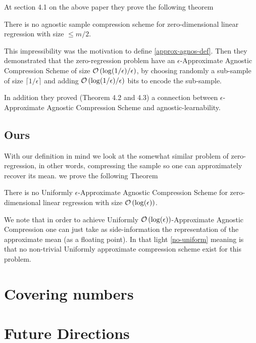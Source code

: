 \documentclass{article}
\begin{document}
At section 4.1 on the above paper they prove the following theorem

\begin{theorem*}[Theorem 4.1]
There is no agnostic sample compression scheme for zero-dimensional linear regression with size $\leq m/2$.
\end{theorem*}

This impressibility was the motivation to define \ref{approx-agnos-def}. Then they demonstrated that the zero-regression problem have an $\epsilon$-Approximate Agnostic Compression Scheme of size $\mathcal{O}\left(\log(1/\epsilon)/\epsilon\right)$, by choosing randomly a sub-sample of size $\lceil 1/\epsilon \rceil$ 
and adding $\mathcal{O}\left(\log(1/\epsilon)/\epsilon\right)$ bits to encode the sub-sample.

In addition they proved (Theorem 4.2 and 4.3) a connection between $\epsilon$-Approximate Agnostic Compression Scheme and agnostic-learnability.

\subsection{Ours}

With our definition in mind we look at the somewhat similar problem of zero-regression, in other words, compressing the sample so one can approximately recover its mean.
we prove the following Theorem

\begin{theorem} \label{no-uniform}
There is no Uniformly $\epsilon$-Approximate Agnostic Compression Scheme for zero-dimensional linear regression with size 
$ \mathcal{O}\left(\log(\epsilon)\right) $.
\end{theorem}

We note that in order to achieve Uniformly $ \mathcal{O}\left(\log(\epsilon)\right) $-Approximate Agnostic Compression 
one can just take as side-information the representation of the approximate mean  (as a floating point).
In that light \ref{no-uniform} meaning is that no non-trivial Uniformly approximate compression scheme exist for this problem.

\section{Covering numbers}

\section{Future Directions}



\end{document}
